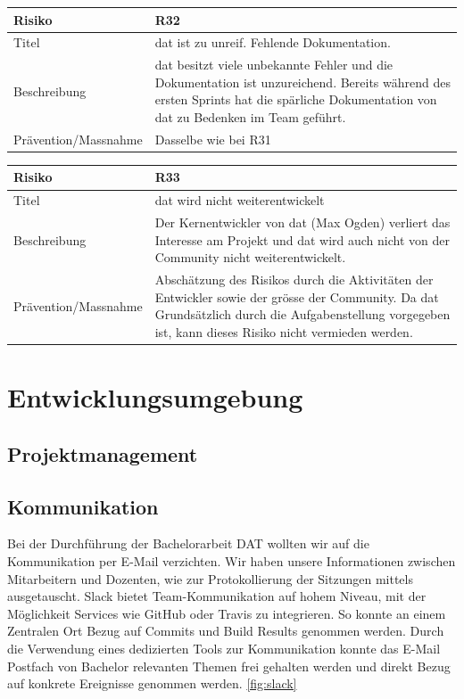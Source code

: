 \begin{tabularx}{\linewidth}{lX}
	\toprule
	Risiko & R32\\
	\midrule
	Titel & \gls{dat} ist zu unreif. Fehlende Dokumentation.\\
	Beschreibung & \gls{dat} besitzt viele unbekannte Fehler und die Dokumentation ist unzureichend. Bereits während des ersten Sprints hat die spärliche Dokumentation von \gls{dat} zu Bedenken im Team geführt.\\
	Prävention/Massnahme & Dasselbe wie bei R31\\
	\bottomrule
\end{tabularx}

\begin{tabularx}{\linewidth}{lX}
	\toprule
	Risiko & R33\\
	\midrule
	Titel & \gls{dat} wird nicht weiterentwickelt\\
	Beschreibung & Der Kernentwickler von \gls{dat} (Max Ogden) verliert das Interesse am Projekt und \gls{dat} wird auch nicht von der Community nicht weiterentwickelt.\\
	Prävention/Massnahme & Abschätzung des Risikos durch die Aktivitäten der Entwickler sowie der grösse der Community. Da \gls{dat} Grundsätzlich durch die Aufgabenstellung vorgegeben ist, kann dieses Risiko nicht vermieden werden.\\
	\bottomrule
\end{tabularx}




\chapter{Entwicklungsumgebung}


\section{Projektmanagement}
\section{Kommunikation}
Bei der Durchführung der Bachelorarbeit DAT wollten wir auf die Kommunikation per E-Mail verzichten. Wir haben unsere Informationen zwischen Mitarbeitern und Dozenten, wie zur Protokollierung der Sitzungen mittels  ausgetauscht. Slack bietet Team-Kommunikation auf hohem Niveau, mit der Möglichkeit Services wie GitHub oder Travis zu integrieren. So konnte an einem Zentralen Ort Bezug auf Commits und Build Results genommen werden. Durch die Verwendung eines dedizierten Tools zur Kommunikation konnte das E-Mail Postfach von Bachelor relevanten Themen frei gehalten werden und direkt Bezug auf konkrete Ereignisse genommen werden. \vref{fig:slack} \\

